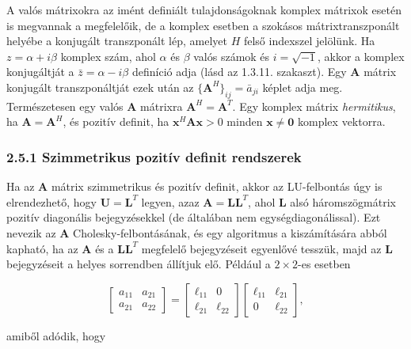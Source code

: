 \documentclass[
  magyar,
  11pt]{article}
\providecommand{\boldsymbol}[1]{\mathbf{#1}}
\begin{document}
A valós mátrixokra az imént definiált tulajdonságoknak komplex mátrixok
esetén is megvannak a megfelelőik, de a komplex esetben a szokásos
mátrixtranszponált helyébe a konjugált transzponált lép, amelyet \(H\)
felső indexszel jelölünk. Ha \(z = \alpha + i\beta\) komplex szám, ahol
\(\alpha\) és \(\beta\) valós számok és \(i = \sqrt{-1}\), akkor a
komplex konjugáltját a \(\bar{z} = \alpha - i\beta\) definíció adja
(lásd az 1.3.11. szakaszt). Egy \(\boldsymbol{A}\) mátrix konjugált
transzponáltját ezek után az
\(\{\boldsymbol{A}^H\}_{ij} = \bar{a}_{ji}\) képlet adja meg.
Természetesen egy valós \(\boldsymbol{A}\) mátrixra
\(\boldsymbol{A}^H = \boldsymbol{A}^T\). Egy komplex mátrix
\emph{hermitikus}, ha \(\boldsymbol{A} = \boldsymbol{A}^H\), és pozitív
definit, ha \(\boldsymbol{x}^H \boldsymbol{A} \boldsymbol{x} > 0\)
minden \(\boldsymbol{x} \neq \boldsymbol{0}\) komplex vektorra.

\subsubsection{2.5.1 Szimmetrikus pozitív definit
rendszerek}\label{szimmetrikus-pozituxedv-definit-rendszerek}

Ha az \(\boldsymbol{A}\) mátrix szimmetrikus és pozitív definit, akkor
az LU-felbontás úgy is elrendezhető, hogy
\(\boldsymbol{U} = \boldsymbol{L}^T\) legyen, azaz
\(\boldsymbol{A} = \boldsymbol{L}\boldsymbol{L}^T\), ahol
\(\boldsymbol{L}\) alsó háromszögmátrix pozitív diagonális
bejegyzésekkel (de általában nem egységdiagonálissal). Ezt nevezik az
\(\boldsymbol{A}\) Cholesky-felbontásának, és egy algoritmus a
kiszámítására abból kapható, ha az \(\boldsymbol{A}\) és a
\(\boldsymbol{L}\boldsymbol{L}^T\) megfelelő bejegyzéseit egyenlővé
tesszük, majd az \(\boldsymbol{L}\) bejegyzéseit a helyes sorrendben
állítjuk elő. Például a \(2 \times 2\)-es esetben

\[\begin{bmatrix} a_{11} & a_{21} \\ a_{21} & a_{22} \end{bmatrix} = \begin{bmatrix} \ell_{11} & 0 \\ \ell_{21} & \ell_{22} \end{bmatrix} \begin{bmatrix} \ell_{11} & \ell_{21} \\ 0 & \ell_{22} \end{bmatrix},\]

amiből adódik, hogy
\end{document}
